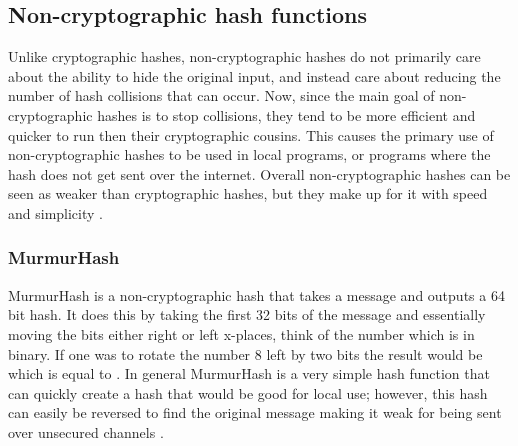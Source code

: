 \documentclass[a4paper, 10pt, draftclsnofoot, onecolumn]{article}
\begin{document}
\subsection*{Non-cryptographic hash functions}
Unlike cryptographic hashes, non-cryptographic hashes do not primarily care about the ability to hide the original input, and instead care about reducing the number of hash collisions that can occur. Now, since the main goal of non-cryptographic hashes is to stop collisions, they tend to be more efficient and quicker to run then their cryptographic cousins. This causes the primary use of non-cryptographic hashes to be used in local programs, or programs where the hash does not get sent over the internet. Overall non-cryptographic hashes can be seen as weaker than cryptographic hashes, but they make up for it with speed and simplicity \cite{hashes}.

\subsubsection*{MurmurHash}
MurmurHash is a non-cryptographic hash that takes a message and outputs a 64 bit hash. It does this by taking the first 32 bits of the message and essentially moving the bits either right or left x-places, think of the number {} which is {} in binary. If one was to rotate the number 8 left by two bits the result would be {} which is equal to {}. In general MurmurHash is a very simple hash function that can quickly create a hash that would be good for local use; however, this hash can easily be reversed to find the original message making it weak for being sent over unsecured channels \cite{murmur}.
\end{document}
